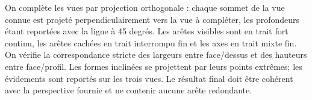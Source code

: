 \begin{corrigebox}
On complète les vues par projection orthogonale : chaque sommet de la
        vue connue est projeté perpendiculairement vers la vue à compléter, les
        profondeurs étant reportées avec la ligne à 45 degrés. Les arêtes visibles sont en
        trait fort continu, les arêtes cachées en trait interrompu fin et les axes en trait
        mixte fin. On vérifie la correspondance stricte des largeurs entre face/dessus et
        des hauteurs entre face/profil. Les formes inclinées se projettent par leurs points
        extrêmes; les évidements sont reportés sur les trois vues. Le résultat final doit
        être cohérent avec la perspective fournie et ne contenir aucune arête redondante.
\end{corrigebox}
